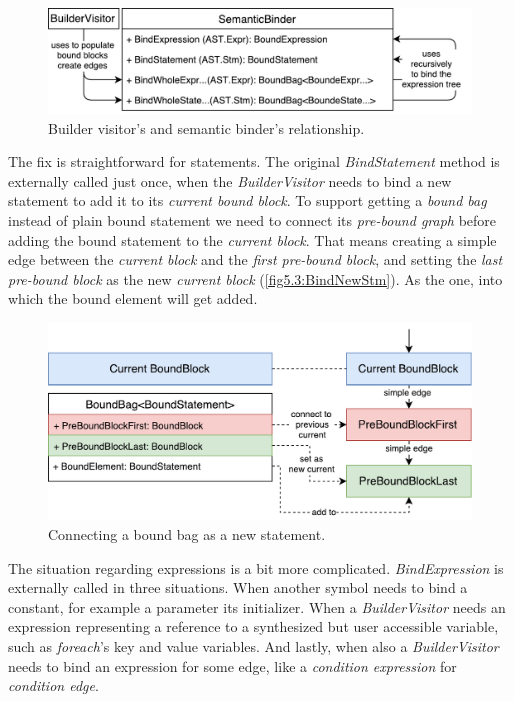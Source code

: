 \begin{figure}[H]
	\centering	
	\includegraphics[scale=0.75]{../img/5_3_BoundWholeExpression}	
	\caption{Builder visitor's and semantic binder's relationship.}
	\label{fig5.3:BindWholeExpr}
\end{figure}

The fix is straightforward for statements. The original \emph{BindStatement} method is externally called just once, when the \emph{BuilderVisitor} needs to bind a new statement to add it to its \emph{current bound block}. To support getting a \emph{bound bag} instead of plain bound statement we need to connect its \emph{pre-bound graph} before adding the bound statement to the \emph{current block}. That means creating a simple edge between the \emph{current block} and the \emph{first pre-bound block}, and setting the \emph{last pre-bound block} as the new \emph{current block} (\autoref{fig5.3:BindNewStm}). As the one, into which the bound element will get added.

\begin{figure}[H]
	\centering	
	\includegraphics[scale=0.75]{../img/5_3_newStatement}	
	\caption{Connecting a bound bag as a new statement.}
	\label{fig5.3:BindNewStm}
\end{figure}

The situation regarding expressions is a bit more complicated. \emph{BindExpression} is externally called in three situations. When another symbol needs to bind a constant, for example a parameter its initializer. When a \emph{BuilderVisitor} needs an expression representing a reference to a synthesized but user accessible variable, such as \emph{foreach}’s key and value variables. And lastly, when also a \emph{BuilderVisitor} needs to bind an expression for some edge, like a \emph{condition expression} for \emph{condition edge}.

